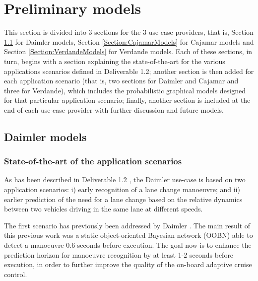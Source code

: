 \section{Preliminary models}\label{Section:PreliminaryModels}
This section is divided into 3 sections for the 3 use-case providers, that is, Section \ref{Section:DaimlerModels} for Daimler models, Section \ref{Section:CajamarModels} for Cajamar models and Section \ref{Section:VerdandeModels} for Verdande models. Each of these sections, in turn,  begins with a section explaining the state-of-the-art for the various applications scenarios defined in Deliverable 1.2; another section is then added for each application scenario (that is, two sections for Daimler and Cajamar and three for Verdande), which includes the probabilistic graphical models designed for that particular application scenario; finally, another section is included at the end of each use-case provider with further discussion and future models.

\subsection{Daimler models}\label{Section:DaimlerModels}

\subsubsection{State-of-the-art of the application scenarios}\label{Section:StateOfTheArt}

As has been described in Deliverable 1.2 \cite{Fer14b}, the Daimler use-case is based on two application scenarios: i) early recognition of a lane change manoeuvre; and ii) earlier prediction of the need for a lane change based on the relative dynamics between two vehicles driving in the same lane at different speeds. 

The first scenario has previously been addressed by Daimler \cite{Kasper2011,kasper2012object,KasperThesis2013}. The main result of this previous work was a static object-oriented Bayesian network (OOBN) \cite{KollerPfeffer1997} able to detect a manoeuvre 0.6 seconds before execution. The goal now is to enhance the prediction horizon for manoeuvre recognition by at least 1-2 seconds before execution, in order to further improve the quality of the on-board adaptive cruise control. 

